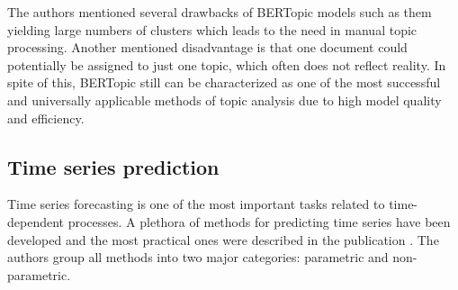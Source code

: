 \documentclass[3p,times,procedia]{elsarticle}
\begin{document}
The authors mentioned several drawbacks of BERTopic models such as them yielding large numbers of clusters which leads to the need in manual topic processing. Another mentioned disadvantage is that one document could potentially be assigned to just one topic, which often does not reflect reality. In spite of this, BERTopic still can be characterized as one of the most successful and universally applicable methods of topic analysis due to high model quality and efficiency.

\subsection{Time series prediction} \label{tsp}

Time series forecasting is one of the most important tasks related to time-dependent processes. A plethora of methods for predicting time series have been developed and the most practical ones were described in the publication \cite{parmezan2019evaluation}. The authors group all methods into two major categories: parametric and non-parametric.
\end{document}

